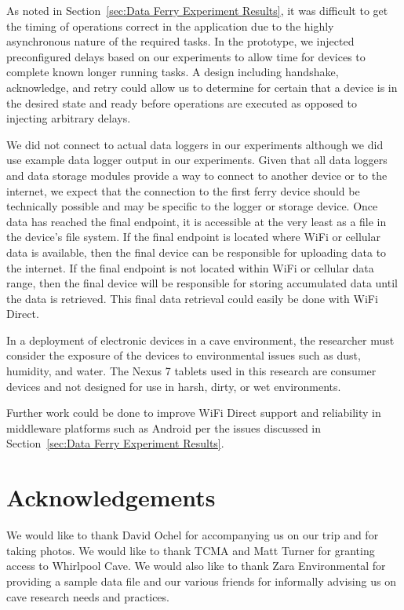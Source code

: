 \documentclass[10pt,twocolumn]{article}
\begin{document}
As noted in Section~\ref{sec:Data Ferry Experiment Results}, it was difficult to get the timing of operations correct in the application due to the highly asynchronous nature of the required tasks.
In the prototype, we injected preconfigured delays based on our experiments to allow time for devices to complete known longer running tasks.
A design including handshake, acknowledge, and retry could allow us to determine for certain that a device is in the desired state and ready before operations are executed as opposed to injecting arbitrary delays.

We did not connect to actual data loggers in our experiments although we did use example data logger output in our experiments.
Given that all data loggers and data storage modules provide a way to connect to another device or to the internet, 
we expect that the connection to the first ferry device should be technically possible and may be specific to the logger or storage device.
Once data has reached the final endpoint, it is accessible at the very least as a file in the device's file system.
If the final endpoint is located where WiFi or cellular data is available, then the final device can be responsible for uploading data to the internet.
If the final endpoint is not located within WiFi or cellular data range, then the final device will be responsible for storing accumulated data until the data is retrieved.
This final data retrieval could easily be done with WiFi Direct.

In a deployment of electronic devices in a cave environment, the researcher must consider the exposure of the devices to environmental issues such as dust, humidity, and water.
The Nexus 7 tablets used in this research are consumer devices and not designed for use in harsh, dirty, or wet environments.

Further work could be done to improve WiFi Direct support and reliability in middleware platforms such as Android per the issues discussed in Section~\ref{sec:Data Ferry Experiment Results}.

\section{Acknowledgements}
\label{sec:Acknowledgements}
We would like to thank David Ochel for accompanying us on our trip and for taking photos. 
We would like to thank TCMA and Matt Turner for granting access to Whirlpool Cave. 
We would also like to thank Zara Environmental for providing a sample data file
and our various friends for informally advising us on cave research needs and practices.


\end{document}
